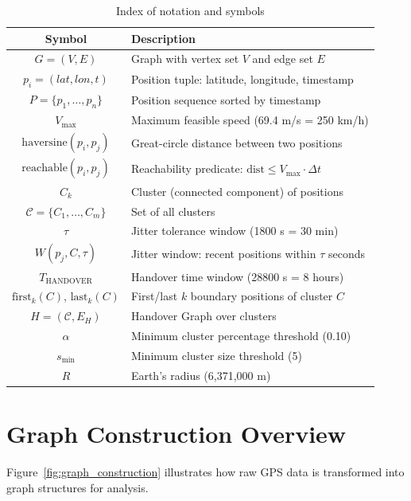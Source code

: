 \begin{table}[ht]
\centering
\caption{Index of notation and symbols}
\label{tab:notation}
\begin{tabular}{|c|p{85mm}|}
\hline
\textbf{Symbol} & \textbf{Description} \\
\hline
$G = (V, E)$ & Graph with vertex set $V$ and edge set $E$ \\
\hline
$p_i = (\mathit{lat}, \mathit{lon}, t)$ & Position tuple: latitude, longitude, timestamp \\
\hline
$P = \{p_1, \ldots, p_n\}$ & Position sequence sorted by timestamp \\
\hline
$V_{\max}$ & Maximum feasible speed (69.4 m/s = 250 km/h) \\
\hline
$\mathrm{haversine}(p_i, p_j)$ & Great-circle distance between two positions \\
\hline
$\mathrm{reachable}(p_i, p_j)$ & Reachability predicate: $\text{dist} \leq V_{\max} \cdot \Delta t$ \\
\hline
$C_k$ & Cluster (connected component) of positions \\
\hline
$\mathcal{C} = \{C_1, \ldots, C_m\}$ & Set of all clusters \\
\hline
$\tau$ & Jitter tolerance window (1800 s = 30 min) \\
\hline
$W(p_j, C, \tau)$ & Jitter window: recent positions within $\tau$ seconds \\
\hline
$T_{\mathrm{HANDOVER}}$ & Handover time window (28800 s = 8 hours) \\
\hline
$\mathrm{first}_k(C)$, $\mathrm{last}_k(C)$ & First/last $k$ boundary positions of cluster $C$ \\
\hline
$H = (\mathcal{C}, E_H)$ & Handover Graph over clusters \\
\hline
$\alpha$ & Minimum cluster percentage threshold (0.10) \\
\hline
$s_{\min}$ & Minimum cluster size threshold (5) \\
\hline
$R$ & Earth's radius (6,371,000 m) \\
\hline
\end{tabular}
\end{table}

\section{Graph Construction Overview}

Figure~\ref{fig:graph_construction} illustrates how raw GPS data is transformed into graph structures for analysis.

